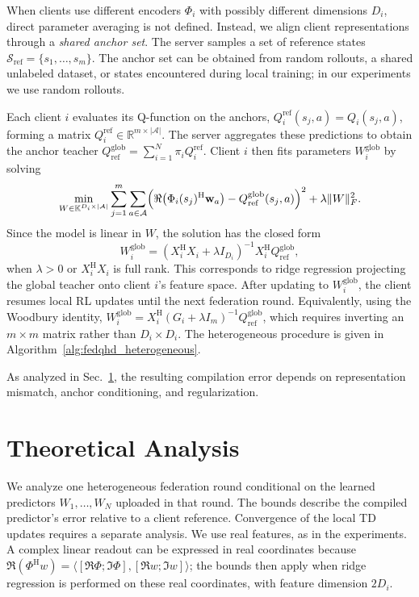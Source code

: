 \documentclass[sigconf,anonymous]{aamas}
\theoremstyle{plain}
\theoremstyle{definition}
\theoremstyle{remark}
\begin{document}
When clients use different encoders $\Phi_i$ with possibly different dimensions $D_i$, direct parameter averaging is not defined. Instead, we align client representations through a \emph{shared anchor set}. The server samples a set of reference states $\mathcal{S}_{\mathrm{ref}}=\{s_1,\dots,s_m\}$. The anchor set can be obtained from random rollouts, a shared unlabeled dataset, or states encountered during local training; in our experiments we use random rollouts.

Each client $i$ evaluates its Q-function on the anchors,
$Q^{\mathrm{ref}}_i(s_j,a)=Q_i(s_j,a)$, forming a matrix $Q^{\mathrm{ref}}_i\in\mathbb{R}^{m\times|\mathcal{A}|}$. The server aggregates these predictions to obtain the anchor teacher $Q^{\mathrm{glob}}_{\mathrm{ref}}
=\sum_{i=1}^N \pi_i Q^{\mathrm{ref}}_i.$ Client $i$ then fits parameters $W_i^{\mathrm{glob}}$ by solving
\[
\min_{W\in\mathbb{K}^{D_i\times|\mathcal{A}|}}
\sum_{j=1}^m\sum_{a\in\mathcal{A}}
\Bigl(\Re\bigl(\Phi_i(s_j)^{\mathrm H}\mathbf w_a\bigr)
-Q^{\mathrm{glob}}_{\mathrm{ref}}(s_j,a)\Bigr)^2
+\lambda\|W\|_F^2.
\]
Since the model is linear in $W$, the solution has the closed form
\[
W^{\mathrm{glob}}_i=
\left(X_i^{\mathrm H}X_i+\lambda I_{D_i}\right)^{-1}X_i^{\mathrm H}Q^{\mathrm{glob}}_{\mathrm{ref}},
\]
when $\lambda>0$ or $X_i^{\mathrm H}X_i$ is full rank.
This corresponds to ridge regression projecting the global teacher onto client $i$’s feature space. After updating to $W_i^{\mathrm{glob}}$, the client resumes local RL updates until the next federation round. Equivalently, using the Woodbury identity, $W_i^{\mathrm{glob}} = X_i^{\mathrm H}(G_i + \lambda I_m)^{-1} Q_{\mathrm{ref}}^{\mathrm{glob}}$, which requires inverting an $m\times m$ matrix rather than $D_i\times D_i$. The heterogeneous procedure is given in Algorithm~\ref{alg:fedqhd_heterogeneous}.

As analyzed in Sec.~\ref{sec:theory}, the resulting compilation error depends on representation mismatch, anchor conditioning, and regularization.


\section{Theoretical Analysis}
\label{sec:theory}
We analyze one heterogeneous federation round conditional on the learned
predictors $W_1,\ldots,W_N$ uploaded in that round.  The bounds describe
the compiled predictor's error relative to a client reference.
Convergence of the local TD updates requires a separate analysis.
We use real features, as in the experiments.  A complex
linear readout can be expressed in real coordinates because
$\Re(\Phi^{\mathrm H}w)=\langle[\Re\Phi;\Im\Phi],
[\Re w;\Im w]\rangle$; the bounds then apply when ridge regression is
performed on these real coordinates, with feature dimension $2D_i$.
\end{document}
